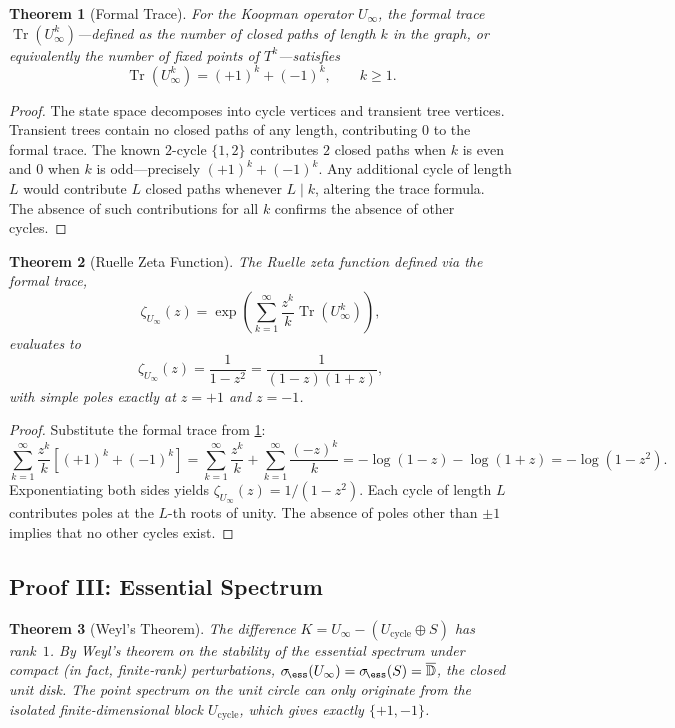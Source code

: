 \documentclass[12pt,a4paper]{article}
\newtheorem{theorem}{Theorem}[section]
\theoremstyle{definition}
\theoremstyle{remark}
\DeclareMathOperator{\Tr}{Tr}
\begin{document}
\begin{theorem}[Formal Trace]\label{thm:formaltrace}
For the Koopman operator $U_\infty$, the formal trace
$\Tr(U_\infty^k)$---defined as the number of closed paths of length
$k$ in the graph, or equivalently the number of fixed points of
$T^k$---satisfies
\[
\Tr(U_\infty^k)=(+1)^k+(-1)^k,\qquad k\ge1.
\]
\end{theorem}

\begin{proof}
The state space decomposes into cycle vertices and transient tree
vertices.
Transient trees contain no closed paths of any length, contributing
$0$ to the formal trace.
The known $2$-cycle $\{1,2\}$ contributes $2$ closed paths when $k$ is
even and $0$ when $k$ is odd---precisely $(+1)^k+(-1)^k$.
Any additional cycle of length $L$ would contribute $L$ closed paths
whenever $L\mid k$, altering the trace formula.
The absence of such contributions for all $k$ confirms the absence of
other cycles.
\end{proof}

\begin{theorem}[Ruelle Zeta Function]\label{thm:ruelle}
The Ruelle zeta function defined via the formal trace,
\[
\zeta_{U_\infty}(z)=
\exp\!\left(\sum_{k=1}^\infty\frac{z^k}{k}\Tr(U_\infty^k)\right),
\]
evaluates to
\[
\zeta_{U_\infty}(z)=\frac1{1-z^2}=\frac1{(1-z)(1+z)},
\]
with simple poles exactly at $z=+1$ and $z=-1$.
\end{theorem}

\begin{proof}
Substitute the formal trace from \cref{thm:formaltrace}:
\[
\sum_{k=1}^\infty\frac{z^k}{k}[(+1)^k+(-1)^k]
= \sum_{k=1}^\infty\frac{z^k}{k}+\sum_{k=1}^\infty\frac{(-z)^k}{k}
= -\log(1-z)-\log(1+z)=-\log(1-z^2).
\]
Exponentiating both sides yields $\zeta_{U_\infty}(z)=1/(1-z^2)$.
Each cycle of length $L$ contributes poles at the $L$-th roots of
unity.
The absence of poles other than $\pm1$ implies that no other cycles
exist.
\end{proof}

\subsection{Proof III: Essential Spectrum}

\begin{theorem}[Weyl's Theorem]\label{thm:weyl}
The difference $K=U_\infty-(U_{\text{cycle}}\oplus S)$ has rank~$1$.
By Weyl's theorem on the stability of the essential spectrum under
compact (in fact, finite‑rank) perturbations,
$\sigma_{\!\ess}(U_\infty)=\sigma_{\!\ess}(S)=\overline{\mathbb D}$,
the closed unit disk.
The point spectrum on the unit circle can only originate from the
isolated finite‑dimensional block $U_{\text{cycle}}$, which gives
exactly $\{+1,-1\}$.
\end{theorem}
\end{document}
